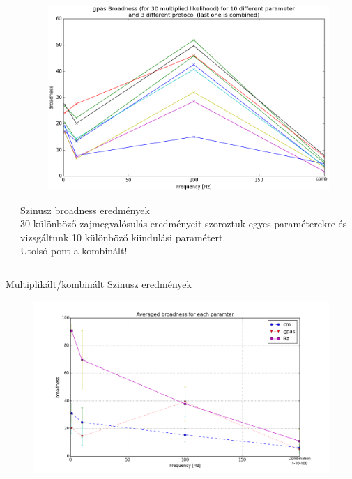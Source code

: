 \documentclass{beamer}
\begin{document}
\begin{darkframes}
\begin{frame}
\begin{columns}[T]
\begin{column}{.5\textwidth}
\end{column}
\begin{column}{.5\textwidth}
	\begin{figure}
		\centering
		\includegraphics[width=\textwidth]{comb/zaps/gpas_brod.png}
	\end{figure}
	\alert{Szinusz broadness eredmények}\\
	30 különböző zajmegvalósulás eredményeit szoroztuk egyes paraméterekre és vizsgáltunk 10 különböző kiindulási paramétert. \\
	\alert{Utolsó pont a kombinált!}
\end{column}
\end{columns}
\end{frame}


\begin{frame}{Multiplikált/kombinált Szinusz eredmények}
\begin{figure}
\centering
\includegraphics[width=\textwidth]{comb/zaps/avrg_broadness.png}
\end{figure}
\end{frame}

\end{darkframes}
\end{document}
